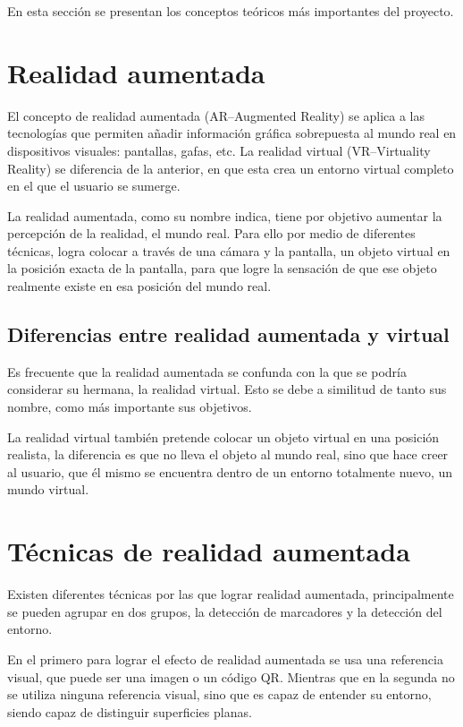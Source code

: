En esta sección se presentan los conceptos teóricos más importantes del proyecto.

\section{Realidad aumentada}

El concepto de realidad aumentada (AR--Augmented Reality) se aplica a las tecnologías que permiten añadir información gráfica sobrepuesta al mundo real en dispositivos visuales: pantallas, gafas, etc.
La realidad virtual (VR--Virtuality Reality) se diferencia de la anterior, en que esta crea un entorno virtual completo en el que el usuario se sumerge.

La realidad aumentada, como su nombre indica, tiene por objetivo aumentar la percepción de la realidad, el mundo real. Para ello por medio de diferentes técnicas, logra colocar a través de una cámara y la pantalla, un objeto virtual en la posición exacta de la pantalla, para que logre la sensación de que ese objeto realmente existe en esa posición del mundo real.

\subsection{Diferencias entre realidad aumentada y virtual} 
Es frecuente que la realidad aumentada se confunda con la que se podría considerar su hermana, la realidad virtual. Esto se debe a similitud de tanto sus nombre, como más importante sus objetivos. 

La realidad virtual también pretende colocar un objeto virtual en una posición realista, la diferencia es que no lleva el objeto al mundo real, sino que hace creer al usuario, que él mismo se encuentra dentro de un entorno totalmente nuevo, un mundo virtual.

\section{Técnicas de realidad aumentada}
Existen diferentes técnicas por las que lograr realidad aumentada, principalmente se pueden agrupar en dos grupos, la detección de marcadores y la detección del entorno. 

En el primero para lograr el efecto de realidad aumentada se usa una referencia visual, que puede ser una imagen o un código QR. Mientras que en la segunda no se utiliza ninguna referencia visual, sino que es capaz de entender su entorno, siendo capaz de distinguir superficies planas.

